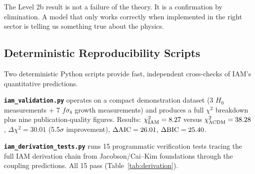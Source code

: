 \documentclass[twocolumn,a4paper,aps,prd,twocolumn,showpacs,notitlepage,superscriptaddress,nofootinbib]{article}
\newcommand{\Dchisq}{\Delta\chi^{2}}
\begin{document}
The Level 2b result is not a failure of the theory.  It is a confirmation by
elimination.  A model that only works correctly when implemented in the right
sector is telling us something true about the physics.

\subsection{Deterministic Reproducibility Scripts}

Two deterministic Python scripts provide fast, independent cross-checks of
IAM's quantitative predictions.

\textbf{\texttt{iam\_validation.py}} operates on a compact demonstration
dataset (3 $H_0$ measurements + 7 $f\sigma_8$ growth measurements) and
produces a full $\chi^2$ breakdown plus nine publication-quality figures.
Results: $\chi^2_{\rm IAM} = 8.27$ versus $\chi^2_{\Lambda\rm CDM} = 38.28$,
$\Dchisq = 30.01$ (5.5$\sigma$ improvement), $\Delta\rm AIC = 26.01$,
$\Delta\rm BIC = 25.40$.

\textbf{\texttt{iam\_derivation\_tests.py}} runs 15 programmatic verification
tests tracing the full IAM derivation chain from Jacobson/Cai--Kim foundations
through the coupling predictions.  All 15 pass (Table~\ref{tab:derivation}).
\end{document}

